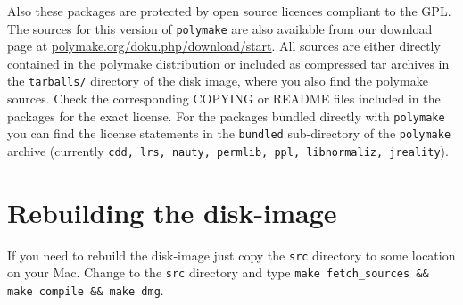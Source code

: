 \documentclass[a4paper]{amsart}
\newcommand{\polymake}{\texttt{polymake}\xspace}
\begin{document}
Also these packages are protected by open source licences compliant to the GPL. The sources for this version of \polymake are also available from our download page at \href{http://polymake.org/doku.php/download/start}{polymake.org/doku.php/download/start}. All sources are either directly contained in the polymake distribution or included as compressed tar archives in the \texttt{tarballs/} directory of the disk image, where you also find the polymake sources. Check the corresponding COPYING or README files included in the packages for the exact license.  For the packages bundled directly with \polymake you can find the license statements in the \texttt{bundled} sub-directory of the \polymake archive (currently \texttt{cdd, lrs, nauty, permlib, ppl, libnormaliz, jreality}).

\section*{Rebuilding the disk-image}

If you need to rebuild the disk-image just copy the \texttt{src} directory to some location on your Mac. Change to the \texttt{src} directory and type \texttt{make fetch\_sources \&\& make compile \&\& make dmg}.
\end{document}
